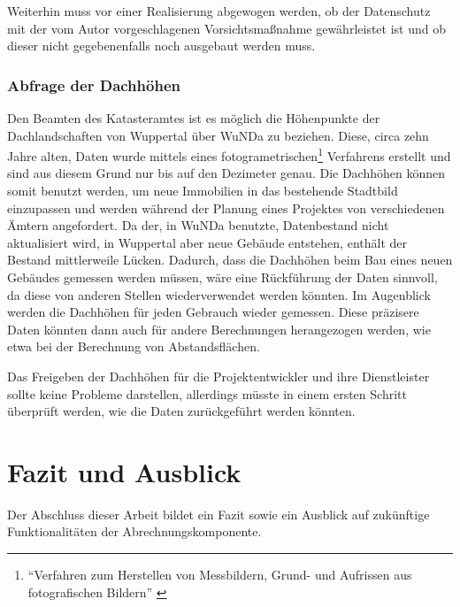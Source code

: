 Weiterhin muss vor einer Realisierung abgewogen werden, ob der Datenschutz mit der vom Autor vorgeschlagenen Vorsichtsmaßnahme gewährleistet ist und ob dieser nicht gegebenenfalls noch ausgebaut werden muss.

\subsection{Abfrage der Dachhöhen}
\label{subsec:dachhoehen}
Den Beamten des Katasteramtes ist es möglich die Höhenpunkte der Dachlandschaften von Wuppertal über \ac{WuNDa} zu beziehen.
Diese, circa zehn Jahre alten, Daten wurde mittels eines fotogrametrischen\footnote{\enquote{Verfahren zum Herstellen von Messbildern, Grund- und Aufrissen aus fotografischen Bildern} \autocite{duden-foto}}
Verfahrens erstellt und sind aus diesem Grund nur bis auf den Dezimeter genau.
Die Dachhöhen können somit benutzt werden, um neue Immobilien in das bestehende Stadtbild einzupassen und werden während der Planung eines Projektes von verschiedenen Ämtern angefordert.
Da der, in \ac{WuNDa} benutzte, Datenbestand nicht aktualisiert wird, in Wuppertal aber neue Gebäude entstehen, enthält der Bestand mittlerweile Lücken.
Dadurch, dass die Dachhöhen beim Bau eines neuen Gebäudes gemessen werden müssen, wäre eine Rückführung der Daten sinnvoll, da diese von anderen Stellen wiederverwendet werden könnten.
Im Augenblick werden die Dachhöhen für jeden Gebrauch wieder gemessen.
Diese präzisere Daten könnten dann auch für andere Berechnungen herangezogen werden, wie etwa bei der Berechnung von Abstandsflächen.

Das Freigeben der Dachhöhen für die Projektentwickler und ihre Dienstleister sollte keine Probleme darstellen, allerdings müsste in einem ersten Schritt überprüft werden, wie die Daten zurückgeführt werden könnten.

\chapter{Fazit und Ausblick}
Der Abschluss dieser Arbeit bildet ein Fazit sowie ein Ausblick auf zukünftige Funktionalitäten der Abrechnungskomponente.

